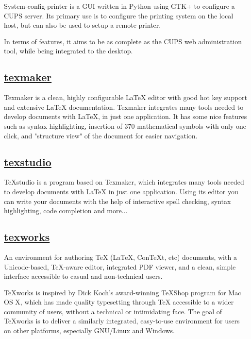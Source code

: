  System-config-printer is a GUI written in Python using GTK+ to
 configure a CUPS server. Its primary use is to configure the printing
 system on the local host, but can also be used to setup a remote
 printer.
 
 In terms of features, it aims to be as complete as the CUPS web
 administration tool, while being integrated to the desktop.

\subsection{\href{http://www.xm1math.net/texmaker/}{texmaker}}

 Texmaker is a clean, highly configurable LaTeX editor with good hot key
 support and extensive LaTeX documentation. Texmaker integrates many tools
 needed to develop documents with LaTeX, in just one application. It has
 some nice features such as syntax highlighting, insertion of 370 mathematical
 symbols with only one click, and "structure view" of the document for easier
 navigation.

\subsection{\href{http://texstudio.sf.net/}{texstudio}}

 TeXstudio is a program based on Texmaker, which integrates many tools needed
 to develop documents with LaTeX in just one application. Using its editor you
 can write your documents with the help of interactive spell checking, syntax
 highlighting, code completion and more...

\subsection{\href{http://www.tug.org/texworks/}{texworks}}

 An environment for authoring TeX (LaTeX, ConTeXt, etc) documents, with
 a Unicode-based, TeX-aware editor, integrated PDF viewer, and a clean,
 simple interface accessible to casual and non-technical users.
 
 TeXworks is inspired by Dick Koch's award-winning TeXShop program for
 Mac OS X, which has made quality typesetting through TeX accessible to
 a wider community of users, without a technical or intimidating face.
 The goal of TeXworks is to deliver a similarly integrated, easy-to-use
 environment for users on other platforms, especially GNU/Linux and Windows.

